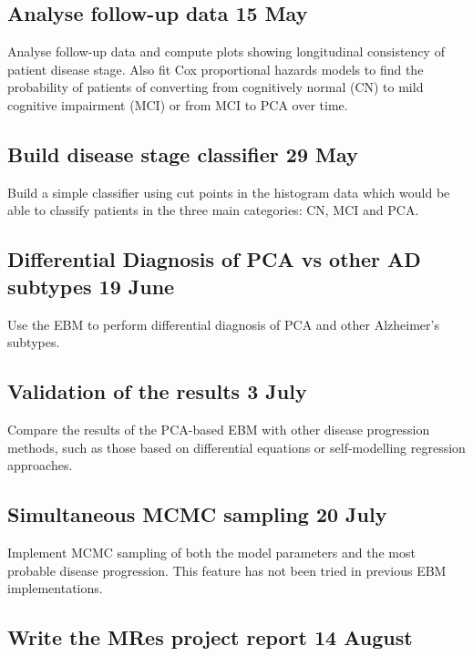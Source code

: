 \documentclass[12pt,a4paper,oneside]{report}
\begin{document}
\subsection*{\noindent Analyse follow-up data \hfill  15 May}
Analyse follow-up data and compute plots showing longitudinal consistency of patient disease stage. Also fit Cox proportional hazards models to find the probability of patients of converting from cognitively normal (CN) to mild cognitive impairment (MCI) or from MCI to PCA over time.

\subsection*{\noindent Build disease stage classifier \hfill  29 May}
Build a simple classifier using cut points in the histogram data which would be able to classify patients in the three main categories: CN, MCI and PCA.

\subsection*{\noindent Differential Diagnosis of PCA vs other AD subtypes \hfill 19 June}
Use the EBM to perform differential diagnosis of PCA and other Alzheimer's subtypes. 

\subsection*{\noindent Validation of the results \hfill  3 July}
Compare the results of the PCA-based EBM with other disease progression methods, such as those based on differential equations or self-modelling regression approaches.

\subsection*{\noindent Simultaneous MCMC sampling \hfill 20 July}

Implement MCMC sampling of both the model parameters and the most probable disease progression. This feature has not been tried in previous EBM implementations.

\subsection*{\noindent Write the MRes project report  \hfill  14 August}
\end{document}
